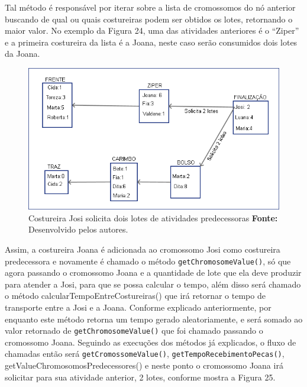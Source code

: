 \par Tal método é responsável por iterar sobre a lista de cromossomos do nó anterior buscando de qual ou quais costureiras 
podem ser obtidos os lotes, retornando o maior valor. No exemplo da Figura 24,
uma das atividades anteriores é o ``Ziper'' e a primeira costureira da lista é a Joana, 
neste caso serão consumidos dois lotes
da Joana.

\newpage

\begin{figure}[h!]
	\centerline{\includegraphics[scale=0.6]{./imagens/processo_solciitacao_de_lotes1.png}}
	\caption[Costureira Josi solicita dois lotes de atividades predecessoras]
	{Costureira Josi solicita dois lotes de atividades predecessoras
	\textbf{Fonte:} Desenvolvido pelos autores.}
	\label{fig:exemplo1}
\end{figure}


\par Assim, a costureira Joana é adicionada ao cromossomo Josi como costureira
predecessora e novamente é chamado o método \texttt{getChromosomeValue()}, só que agora passando o cromossomo 
Joana e a quantidade de lote que ela deve produzir para atender a Josi, para que
se possa calcular o tempo, além disso será chamado o método calcularTempoEntreCostureiras() que irá retornar o 
tempo de transporte entre a Josi e a Joana. Conforme explicado anteriormente, 
por enquanto este método retorna um tempo gerado aleatoriamente, e será somado
ao valor retornado de \texttt{getChromosomeValue()} que  foi chamado passando o cromossomo Joana.
Seguindo as execuções dos métodos já explicados, o fluxo de chamadas então será
\texttt{getCromossomeValue()}, \texttt{getTempoRecebimentoPecas()}, getValueChromosomosPredecessores() e 
neste ponto o cromossomo Joana irá solicitar para sua atividade anterior, 2
lotes, conforme mostra a Figura 25.


